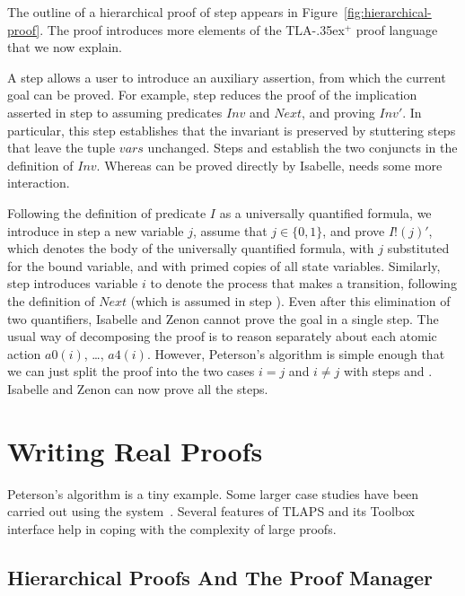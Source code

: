 \documentclass[a4paper,draft]{llncs}
\makeatletter
\newcommand{\tlaplus}{\mbox{TLA\kern -.35ex$^+$}\xspace}
\newcommand{\step}[2]{{\tlatex \@pfstepnum{#1}{#2}}}
\makeatother
\begin{document}
The outline of a hierarchical proof of step \step{1}{2} appears in
Figure~\ref{fig:hierarchical-proof}. 
The proof
introduces more elements of the \tlaplus proof language that we now explain.

A \SUFFICES step allows a user to introduce an auxiliary assertion, from which
the current goal can be proved. For example, step \step{2}{1} reduces the proof
of the implication asserted in step \step{1}{2} to assuming predicates $Inv$ and
$Next$, and proving $Inv'$. In particular, this step establishes that the
invariant is preserved by stuttering steps that leave the tuple $vars$ unchanged. Steps
\step{2}{2} and \step{2}{3} establish the two conjuncts in the definition of
$Inv$. Whereas \step{2}{2} can be proved directly by Isabelle, \step{2}{3} needs
some more interaction. 

Following the definition of predicate $I$ as a universally quantified formula,
we introduce in step \step{3}{1} a new variable $j$, assume that $j \in
\{0,1\}$, and prove $I!(j)'$, which denotes the body of the universally
quantified formula, with $j$ substituted for the bound variable, and with primed
copies of all state variables. Similarly, step \step{3}{2} introduces variable
$i$ to denote the process that makes a transition, following the definition of
$Next$ (which is assumed in step \step{2}{1}). Even after this elimination of
two quantifiers, Isabelle and Zenon cannot prove the goal in a single
step. The usual way of decomposing the proof is to reason separately
about each atomic action $a0(i)$, \ldots, $a4(i)$. However,
Peterson's algorithm is simple enough that we can just split the proof
into the two cases $i=j$ and $i \neq j$ with steps \step{3}{3} and
\step{3}{4}.  Isabelle and Zenon can now prove all the steps.


\section{Writing Real Proofs}
\label{sec:real-proofs}

Peterson's algorithm is a tiny example.
Some larger case studies have been carried out using the
system~\cite{lamport:byzantine-paxos,lu:pastry,parno:memoir}. Several
features of TLAPS and its Toolbox interface help in coping with the
complexity of large proofs.


\subsection{Hierarchical Proofs And The Proof Manager}
\label{sec:hierarchy}
\end{document}
